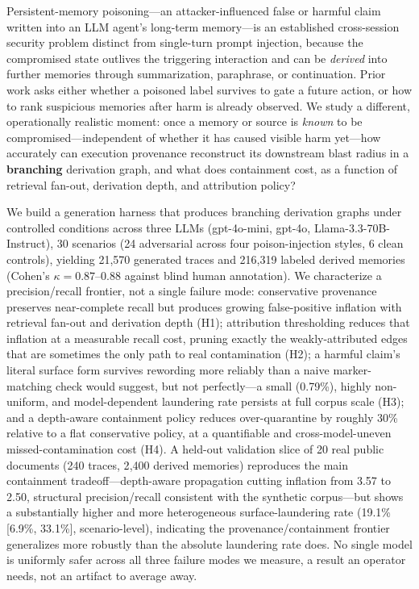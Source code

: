 Persistent-memory poisoning---an attacker-influenced false or harmful
claim written into an LLM agent's long-term memory---is an established
cross-session security problem distinct from single-turn prompt
injection, because the compromised state outlives the triggering
interaction and can be \emph{derived} into further memories through
summarization, paraphrase, or continuation. Prior work asks either
whether a poisoned label survives to gate a future action, or how to
rank suspicious memories after harm is already observed. We study a
different, operationally realistic moment: once a memory or source is
\emph{known} to be compromised---independent
of whether it has caused visible harm yet---how accurately can execution
provenance reconstruct its downstream blast radius in a \textbf{branching}
derivation graph, and what does containment cost, as a function of
retrieval fan-out, derivation depth, and attribution policy?

We build a generation harness that produces branching derivation
graphs under controlled conditions across three LLMs (gpt-4o-mini,
gpt-4o, Llama-3.3-70B-Instruct), 30 scenarios (24 adversarial across
four poison-injection styles, 6 clean controls), yielding 21,570
generated traces and 216,319 labeled derived memories (Cohen's
$\kappa = 0.87$--$0.88$ against blind human annotation). We characterize
a precision/recall frontier, not a single failure mode: conservative
provenance preserves near-complete recall but produces growing
false-positive inflation with retrieval fan-out and derivation depth
(H1); attribution thresholding reduces that inflation at a measurable
recall cost, pruning exactly the weakly-attributed edges that are
sometimes the only path to real contamination (H2); a harmful claim's
literal surface form survives rewording more reliably than a naive
marker-matching check would suggest, but not perfectly---a small
(0.79\%), highly non-uniform, and model-dependent laundering rate
persists at full corpus scale (H3); and a depth-aware containment
policy reduces over-quarantine by roughly 30\% relative to a flat
conservative policy, at a quantifiable and cross-model-uneven
missed-contamination cost (H4). A held-out validation slice of 20 real
public documents (240 traces, 2{,}400 derived memories) reproduces the
main containment tradeoff---depth-aware propagation cutting inflation
from 3.57 to 2.50, structural precision/recall consistent with the
synthetic corpus---but shows a substantially higher and more
heterogeneous surface-laundering rate (19.1\% [6.9\%, 33.1\%],
scenario-level), indicating the provenance/containment frontier
generalizes more robustly than the absolute laundering rate does. No
single model is uniformly safer across all three failure modes we
measure, a result an operator needs, not an artifact to average away.
